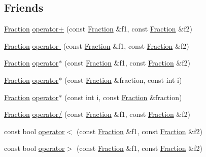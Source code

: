 \subsection*{Friends}
\begin{DoxyCompactItemize}
\item 
\hyperlink{classprism_1_1utils_1_1_fraction}{Fraction} \hyperlink{classprism_1_1utils_1_1_fraction_a225c4aec1a9cdd366b04be2642ecf3bc}{operator+} (const \hyperlink{classprism_1_1utils_1_1_fraction}{Fraction} \&f1, const \hyperlink{classprism_1_1utils_1_1_fraction}{Fraction} \&f2)
\item 
\hyperlink{classprism_1_1utils_1_1_fraction}{Fraction} \hyperlink{classprism_1_1utils_1_1_fraction_aa93e0ab89fa477f3b044cf5826df7c14}{operator-\/} (const \hyperlink{classprism_1_1utils_1_1_fraction}{Fraction} \&f1, const \hyperlink{classprism_1_1utils_1_1_fraction}{Fraction} \&f2)
\item 
\hyperlink{classprism_1_1utils_1_1_fraction}{Fraction} \hyperlink{classprism_1_1utils_1_1_fraction_ad106ee756801021779f14e992439db4a}{operator$\ast$} (const \hyperlink{classprism_1_1utils_1_1_fraction}{Fraction} \&f1, const \hyperlink{classprism_1_1utils_1_1_fraction}{Fraction} \&f2)
\item 
\hyperlink{classprism_1_1utils_1_1_fraction}{Fraction} \hyperlink{classprism_1_1utils_1_1_fraction_a00eb461e6959195ce533d9d8f9b0855d}{operator$\ast$} (const \hyperlink{classprism_1_1utils_1_1_fraction}{Fraction} \&fraction, const int i)
\item 
\hyperlink{classprism_1_1utils_1_1_fraction}{Fraction} \hyperlink{classprism_1_1utils_1_1_fraction_a2f76d38f8274375542a97c3154af16eb}{operator$\ast$} (const int i, const \hyperlink{classprism_1_1utils_1_1_fraction}{Fraction} \&fraction)
\item 
\hyperlink{classprism_1_1utils_1_1_fraction}{Fraction} \hyperlink{classprism_1_1utils_1_1_fraction_a2a185031bd64d6b227509aeacf3b5c69}{operator/} (const \hyperlink{classprism_1_1utils_1_1_fraction}{Fraction} \&f1, const \hyperlink{classprism_1_1utils_1_1_fraction}{Fraction} \&f2)
\item 
const bool \hyperlink{classprism_1_1utils_1_1_fraction_a557b4641e321113411fe440a2bc4e9cb}{operator$<$} (const \hyperlink{classprism_1_1utils_1_1_fraction}{Fraction} \&f1, const \hyperlink{classprism_1_1utils_1_1_fraction}{Fraction} \&f2)
\item 
const bool \hyperlink{classprism_1_1utils_1_1_fraction_a4307a97fd1a744418e8e2d64fb05ffd5}{operator$>$} (const \hyperlink{classprism_1_1utils_1_1_fraction}{Fraction} \&f1, const \hyperlink{classprism_1_1utils_1_1_fraction}{Fraction} \&f2)

\end{DoxyCompactItemize}
